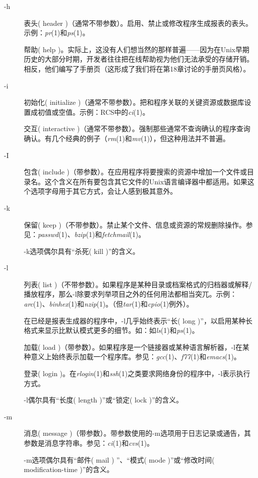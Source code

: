 \documentclass[12pt,oneside]{book}
\begin{document}
\begin{common-format}
\begin{description}
\item[-h] 表头( header )（通常不带参数）。启用、禁止或修改程序生成报表的表头。示例：\textit{pr}(1)和\textit{ps}(1)。

帮助( help )。实际上，这没有人们想当然的那样普遍——因为在Unix早期历史的大部分时期，开发者往往把在线帮助视为他们无法承受的存储开销。相反，他们编写了手册页（这形成了我们将在第18章讨论的手册页风格）。

\item[-i] 初始化( initialize )（通常不带参数）。把和程序关联的关键资源或数据库设置成初值或空值。示例：RCS中的\textit{ci}(1)。

交互( interactive )（通常不带参数）。强制那些通常不查询确认的程序查询确认。有几个经典的例子（\textit{rm}(1)和\textit{mv}(1)），但这种用法并不普遍。

\item[-I] 包含( include )（带参数）。在应用程序将要搜索的资源中增加一个文件或目录名。这个含义在所有要包含其它文件的Unix语言编译器中都适用。如果这个选项字母用于其它方式，会让人感到极其意外。

\item[-k] 保留( keep )（不带参数）。禁止某个文件、信息或资源的常规删除操作。参见：\textit{passwd}(1)、\textit{bzip}(1)和\textit{fetchmail}(1)。

-k选项偶尔具有“杀死( kill )”的含义。

\item[-l] 列表( list )（不带参数）。如果程序是某种目录或档案格式的归档器或解释/播放程序，那么-l除要求列举项目之外的任何用法都相当突兀。示例：\textit{arc}(1)、\textit{binhex}(1)和\textit{nzip}(1)。（但\textit{tar}(1)和\textit{cpio}(1)例外）。

在已经是报表生成器的程序中，-l几乎始终表示“长( long )”，以启用某种长格式来显示比默认模式更多的细节。如：如\textit{ls}(1)和\textit{ps}(1)。

加载( load )（带参数）。如果程序是一个链接器或某种语言解析器，-l在某种意义上始终表示加载一个程序库。参见：\textit{gcc}(1)、\textit{f77}(1)和\textit{emacs}(1)。

 登录( login )。在\textit{rlogin}(1)和\textit{ssh}(1)之类要求网络身份的程序中，-l表示执行方式。

-l偶尔具有“长度( length )”或“锁定( lock )”的含义。

\item[-m] 消息( message )（带参数）。带参数使用的-m选项用于日志记录或通告，其参数是消息字符串。参见：\textit{ci}(1)和\textit{cvs}(1)。

-m选项偶尔具有“邮件( mail ) ”、“模式( mode )”或“修改时间( modification-time )”的含义。


\end{description}
\end{common-format}
\end{document}
